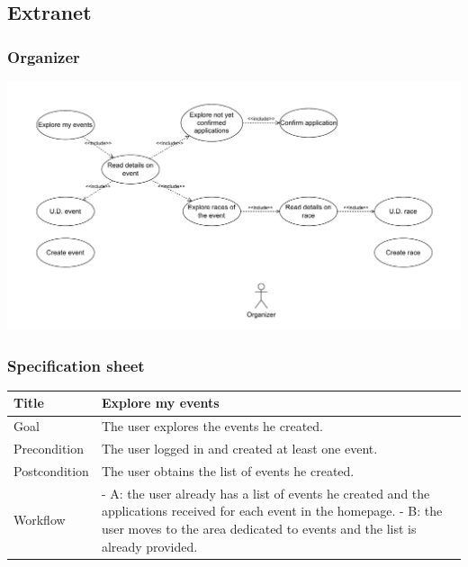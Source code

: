 \documentclass{beamer}
\begin{document}
\subsection*{Extranet}

\begin{frame}
    \frametitle{Organizer}
    \centering
    \includegraphics[width=0.9\linewidth]{drawio/organizer.pdf}
\end{frame}


\begin{frame}
    \frametitle{Specification sheet}
    \begin{table}
        \tiny
        \begin{tabular}{|p{2cm}|p{6cm}|}
        \hline
        Title & \textbf{Explore my events} \\
        \hline
        Goal & The user explores the events he created. \\
        \hline
        Precondition & The user logged in and created at least one event.\\
        \hline
        Postcondition & The user obtains the list of events he created. \\
        \hline
        Workflow &
        - A: the user already has a list of events he created and the applications received for each event 
        in the homepage. \newline
        - B: the user moves to the area dedicated to events and the list is already provided. \\
        \hline
        \end{tabular}
\end{table}
\end{frame}
\end{document}
